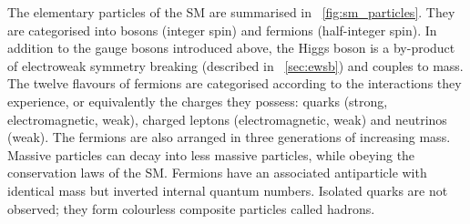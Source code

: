The elementary particles of the SM are summarised in \Figure~\ref{fig:sm_particles}.
They are categorised into bosons (integer spin) and fermions (half-integer spin).
In addition to the gauge bosons introduced above, the Higgs boson is a by-product
of electroweak symmetry breaking (described in \Section~\ref{sec:ewsb}) and couples to 
mass. The twelve flavours of fermions are categorised according to the interactions they 
experience, or equivalently the charges they possess: quarks (strong, electromagnetic, 
weak), charged leptons (electromagnetic, weak) and neutrinos (weak). The fermions are also 
arranged in three generations of increasing mass. Massive particles can decay into less 
massive particles, while obeying the conservation laws of the SM. Fermions have an 
associated antiparticle with identical mass but inverted internal quantum numbers.
Isolated quarks are not observed; they form colourless composite particles called hadrons.
